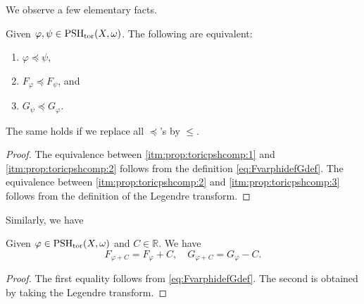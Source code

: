 We observe a few elementary facts.
\begin{proposition}\label{prop:toricpshcomp}
    Given $\varphi,\psi\in \mathrm{PSH}_{\mathrm{tor}}(X,\omega)$. The following are equivalent:
    \begin{enumerate}
        \item\label{itm:prop:toricpshcomp:1} $\varphi\preceq \psi$,
        \item\label{itm:prop:toricpshcomp:2} $F_{\varphi}\preceq F_{\psi}$, and
        \item\label{itm:prop:toricpshcomp:3} $G_{\psi}\preceq G_{\varphi}$.
    \end{enumerate}
    The same holds if we replace all $\preceq$'s by $\leq$.
\end{proposition}
\begin{proof}
    The equivalence between \ref{itm:prop:toricpshcomp:1} and \ref{itm:prop:toricpshcomp:2} follows from the definition \eqref{eq:FvarphidefGdef}. The equivalence between \ref{itm:prop:toricpshcomp:2} and \ref{itm:prop:toricpshcomp:3} follows from the definition of the Legendre transform.
\end{proof}

Similarly, we have
\begin{proposition}\label{prop:toricpluscst}
    Given $\varphi\in \mathrm{PSH}_{\mathrm{tor}}(X,\omega)$ and $C\in \mathbb{R}$. We have
    \[
    F_{\varphi+C}=F_{\varphi}+C,\quad G_{\varphi+C}=G_{\varphi}-C.
    \]
\end{proposition}
\begin{proof}
    The first equality follows from \eqref{eq:FvarphidefGdef}. The second is obtained by taking the Legendre transform.
\end{proof}


